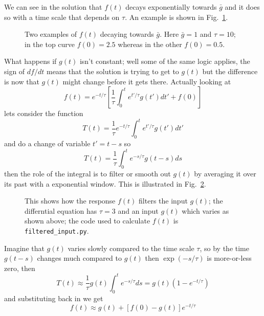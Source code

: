 \documentclass{article}
\begin{document}
We can see in the
solution that $f(t)$ decays exponentially towards $\bar{g}$ and it
does so with a time scale that depends on $\tau$. An example is shown in Fig.~\ref{exp_decay}.

\begin{figure}[tb]
\begin{center}

\end{center}
\caption{Two examples of $f(t)$ decaying towards $\bar{g}$. Here
  $\bar{g}=1$ and $\tau=10$; in the top curve $f(0)=2.5$ whereas in
  the other $f(0)=0.5$. \label{exp_decay}}
\end{figure}

What happens if $g(t)$ isn't constant; well some of the same logic applies, the sign of $df/dt$ means that the solution is trying to get to $g(t)$ but the difference is now that $g(t)$ might change before it gets there. Actually looking at 
\begin{equation}
f(t)=e^{-t/\tau}\left[\frac{1}{\tau}\int_0^t e^{t'/\tau} g(t')dt'+f(0)\right]
\end{equation}
lets consider the function
\begin{equation}
T(t)=\frac{1}{\tau}e^{-t/\tau}\int_0^t e^{t'/\tau} g(t')dt'
\end{equation}
and do a change of variable $t'=t-s$ so 
\begin{equation}
T(t)=\frac{1}{\tau}\int_0^t e^{-s/\tau} g(t-s)ds
\end{equation}
then the role of the integral is to filter or smooth out $g(t)$ by
averaging it over its past with a exponential window. This is
illustrated in Fig.~\ref{filtering}.

\begin{figure}[tb]
\begin{center}

\end{center}
\caption{This shows how the response $f(t)$ filters the input $g(t)$;
  the differntial equation has $\tau=3$ and an input $g(t)$ which
  varies as shown above; the code used to calculate $f(t)$ is
  \texttt{filtered\_input.py}. \label{filtering}}
\end{figure}

Imagine that $g(t)$ varies slowly compared to the time scale $\tau$, so by the time $g(t-s)$ changes much compared to $g(t)$ then $\exp(-s/\tau)$ is more-or-less zero, then
\begin{equation}
T(t)\approx\frac{1}{\tau}g(t)\int_0^t e^{-s/\tau}ds=g(t)\left(1-e^{-t/\tau}\right)
\end{equation}
and substituting back in we get
\begin{equation}
f(t)\approx g(t)+[f(0)-g(t)]e^{-t/\tau}
\end{equation}
\end{document}
